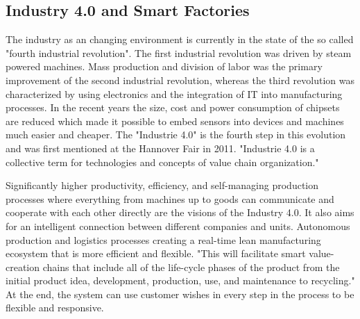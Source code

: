 \subsection{Industry 4.0 and Smart Factories}

The industry as an changing environment is currently in the state of the so called "fourth industrial revolution".
The first industrial revolution was driven by steam powered machines.
Mass production and division of labor was the primary improvement of the second industrial revolution, whereas the third revolution was characterized by using electronics and the integration of \ac{IT} into manufacturing processes.\cite[cf.][p. 1]{Lom2016}
In the recent years the size, cost and power consumption of chipsets are reduced which made it possible to embed sensors into devices and machines much easier and cheaper.\cite[cf.][p. 1]{Brito2016}
The "Industrie 4.0" is the fourth step in this evolution and was first mentioned at the Hannover Fair in 2011.\cite[cf.][p. 1]{Lom2016}
"Industrie 4.0 is a collective term for technologies and concepts of value chain organization."\cite[cf.][p. 11]{Her2015}

Significantly higher productivity, efficiency, and self-managing production processes where everything from machines up to goods can communicate and cooperate with each other directly are the visions of the Industry 4.0.\cite[cf.]{Lyd2016}
It also aims for an intelligent connection between different companies and units.
Autonomous production and logistics processes creating a real-time lean manufacturing ecosystem that is more efficient and flexible.\cite[cf.]{Lyd2016}
"This will facilitate smart value-creation chains that include all of the life-cycle phases of the product from the initial product idea, development, production, use, and maintenance to recycling."\cite{Lyd2016}
At the end, the system can use customer wishes in every step in the process to be flexible and responsive.\cite[cf.]{Lyd2016}

